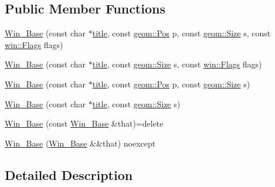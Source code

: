 \subsection*{Public Member Functions}
\begin{DoxyCompactItemize}
\item 
\mbox{\hyperlink{classrolmodl_1_1_win_a3ff14fcd3028c11faaaa4dc2b70de9ac}{Win\+\_\+\+Base}} (const char $\ast$\mbox{\hyperlink{classrolmodl_1_1_win___base_abc249a06cd285e302175c0371ed2564a}{title}}, const \mbox{\hyperlink{structrolmodl_1_1geom_1_1_pos}{geom\+::\+Pos}} p, const \mbox{\hyperlink{structrolmodl_1_1geom_1_1_size}{geom\+::\+Size}} s, const \mbox{\hyperlink{structrolmodl_1_1win_1_1_flags}{win\+::\+Flags}} flags)
\item 
\mbox{\hyperlink{classrolmodl_1_1_win_aaa9e04d7aa993555afbdf34ab3fd92f0}{Win\+\_\+\+Base}} (const char $\ast$\mbox{\hyperlink{classrolmodl_1_1_win___base_abc249a06cd285e302175c0371ed2564a}{title}}, const \mbox{\hyperlink{structrolmodl_1_1geom_1_1_size}{geom\+::\+Size}} s, const \mbox{\hyperlink{structrolmodl_1_1win_1_1_flags}{win\+::\+Flags}} flags)
\item 
\mbox{\hyperlink{classrolmodl_1_1_win_a520190cbd5064e620f0fca89eaae6f06}{Win\+\_\+\+Base}} (const char $\ast$\mbox{\hyperlink{classrolmodl_1_1_win___base_abc249a06cd285e302175c0371ed2564a}{title}}, const \mbox{\hyperlink{structrolmodl_1_1geom_1_1_pos}{geom\+::\+Pos}} p, const \mbox{\hyperlink{structrolmodl_1_1geom_1_1_size}{geom\+::\+Size}} s)
\item 
\mbox{\hyperlink{classrolmodl_1_1_win_afb98cea3cee1b466a4bb51d275123238}{Win\+\_\+\+Base}} (const char $\ast$\mbox{\hyperlink{classrolmodl_1_1_win___base_abc249a06cd285e302175c0371ed2564a}{title}}, const \mbox{\hyperlink{structrolmodl_1_1geom_1_1_size}{geom\+::\+Size}} s)
\item 
\mbox{\hyperlink{classrolmodl_1_1_win_afa33e371e1333e1fee8c2aac7fadf3d7}{Win\+\_\+\+Base}} (const \mbox{\hyperlink{classrolmodl_1_1_win___base}{Win\+\_\+\+Base}} \&that)=delete
\item 
\mbox{\hyperlink{classrolmodl_1_1_win_a87cda590b1948eaf6d1638fe044cdd63}{Win\+\_\+\+Base}} (\mbox{\hyperlink{classrolmodl_1_1_win___base}{Win\+\_\+\+Base}} \&\&that) noexcept
\end{DoxyCompactItemize}


\subsection{Detailed Description}


